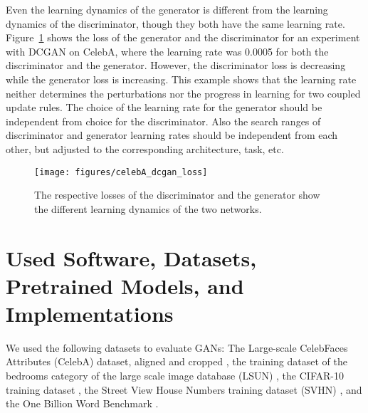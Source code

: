 \documentclass{article}
\begin{document}
Even the learning dynamics of the generator is different from the
learning dynamics of the discriminator, though they both have the same
learning rate. Figure~\ref{fig:lr} shows the loss of the generator and
the discriminator for an experiment with DCGAN on
CelebA, where the learning rate was
0.0005 for both the discriminator and the generator.
However, the discriminator loss is decreasing while the generator loss
is increasing.
This example shows that the learning rate neither determines the
perturbations nor the progress in learning for two coupled update
rules.
The choice of the learning rate for the generator should be
independent from choice for the
discriminator.
Also the search ranges of discriminator and generator learning
rates should be independent from each other, but adjusted to
the corresponding architecture, task, etc.

\begin{figure}[H]
  \centering
  \texttt{[image: figures/celebA\_dcgan\_loss]}
  \caption[Learning dynamics of two networks.]{The respective losses of the
  discriminator and the generator show the different learning dynamics of the two networks.}
  \label{fig:lr}
\end{figure}

\section{Used Software, Datasets, Pretrained Models, and Implementations}
\label{sec:soft}

We used the following datasets to evaluate GANs: The Large-scale CelebFaces
Attributes (CelebA) dataset, aligned and cropped \cite{Liu:15}, the training
dataset of the bedrooms category of the large scale image database (LSUN)
\cite{Yu:15}, the CIFAR-10 training dataset \cite{Krizhevsky:12}, the Street View
House Numbers training dataset (SVHN) \cite{Netzer:11}, and the One Billion Word
Benchmark \cite{Chelba:13}.
\end{document}
